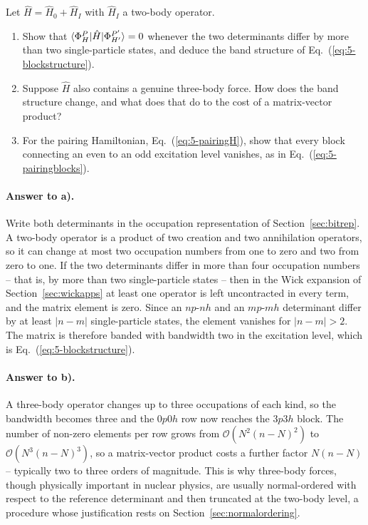 Let $\hat{H}=\hat{H}_0+\hat{H}_I$ with $\hat{H}_I$ a two-body operator.

\begin{enumerate}
  \item[a)] Show that $\langle \Phi_H^P | \hat{H} | \Phi_{H'}^{P'} \rangle=0$ whenever
  the two determinants differ by more than two single-particle states, and
  deduce the band structure of Eq.~(\ref{eq:5-blockstructure}).
  \item[b)] Suppose $\hat{H}$ also contains a genuine three-body force.  How
  does the band structure change, and what does that do to the cost of a
  matrix-vector product?
  \item[c)] For the pairing Hamiltonian, Eq.~(\ref{eq:5-pairingH}), show that
  every block connecting an even to an odd excitation level vanishes, as in
  Eq.~(\ref{eq:5-pairingblocks}).
\end{enumerate}

\paragraph{Answer to a).}
Write both determinants in the occupation representation of
Section~\ref{sec:bitrep}.  A two-body operator is a product of two creation
and two annihilation operators, so it can change at most two occupation
numbers from one to zero and two from zero to one.  If the two determinants
differ in more than four occupation numbers -- that is, by more than two
single-particle states -- then in the Wick expansion of
Section~\ref{sec:wickapps} at least one operator is left uncontracted in every
term, and the matrix element is zero.  Since an $np$-$nh$ and an $mp$-$mh$
determinant differ by at least $|n-m|$ single-particle states, the element
vanishes for $|n-m|>2$.  The matrix is therefore banded with bandwidth two in
the excitation level, which is Eq.~(\ref{eq:5-blockstructure}).

\paragraph{Answer to b).}
A three-body operator changes up to three occupations of each kind, so the
bandwidth becomes three and the $0p0h$ row now reaches the $3p3h$ block.  The
number of non-zero elements per row grows from $\mathcal{O}(N^2(n-N)^2)$ to
$\mathcal{O}(N^3(n-N)^3)$, so a matrix-vector product costs a further factor
$N(n-N)$ -- typically two to three orders of magnitude.  This is why
three-body forces, though physically important in nuclear physics, are usually
normal-ordered with respect to the reference determinant and then truncated at
the two-body level, a procedure whose justification rests on
Section~\ref{sec:normalordering}.

